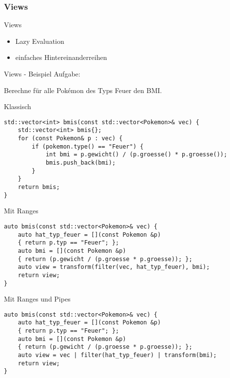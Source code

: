 \subsubsection{Views}

\begin{frame}{Views}
    \begin{itemize}
        \item Lazy Evaluation
        \item einfaches Hintereinanderreihen
    \end{itemize}
\end{frame}

\begin{frame}{Views - Beispiel}
    Aufgabe:

    Berechne für alle Pokémon des Typs Feuer den BMI.
\end{frame}

\begin{frame}[fragile]{Klassisch}
    \begin{verbatim}
std::vector<int> bmis(const std::vector<Pokemon>& vec) {
    std::vector<int> bmis{};
    for (const Pokemon& p : vec) {
        if (pokemon.type() == "Feuer") {
            int bmi = p.gewicht() / (p.groesse() * p.groesse());
            bmis.push_back(bmi);
        }
    }
    return bmis;
}
\end{verbatim}
\end{frame}

\begin{frame}[fragile]{Mit Ranges}
    \begin{verbatim}
auto bmis(const std::vector<Pokemon>& vec) {
    auto hat_typ_feuer = [](const Pokemon &p)
    { return p.typ == "Feuer"; };
    auto bmi = [](const Pokemon &p)
    { return (p.gewicht / (p.groesse * p.groesse)); };
    auto view = transform(filter(vec, hat_typ_feuer), bmi);
    return view;
}
\end{verbatim}
\end{frame}

\begin{frame}[fragile]{Mit Ranges und Pipes}
    \begin{verbatim}
auto bmis(const std::vector<Pokemon>& vec) {
    auto hat_typ_feuer = [](const Pokemon &p)
    { return p.typ == "Feuer"; };
    auto bmi = [](const Pokemon &p)
    { return (p.gewicht / (p.groesse * p.groesse)); };
    auto view = vec | filter(hat_typ_feuer) | transform(bmi);
    return view;
}
\end{verbatim}
\end{frame}

